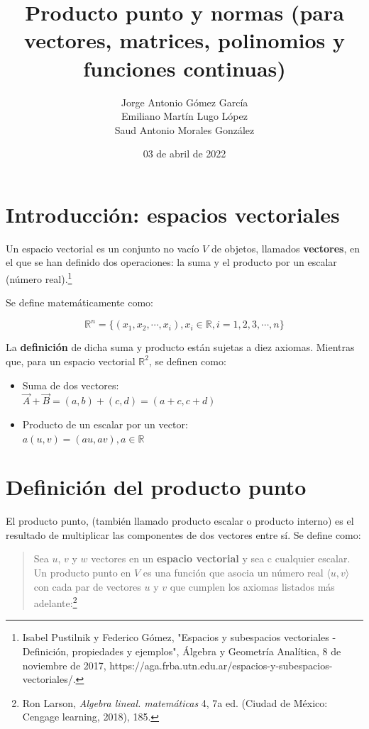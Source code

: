 \documentclass{article}
\title{Producto punto y normas (para vectores, matrices, polinomios y funciones continuas)}
\author{
    Jorge Antonio Gómez García \\
    Emiliano Martín Lugo López \\
    Saud Antonio Morales González}
\date{03 de abril de 2022}
\begin{document}
\maketitle

\section{Introducción: espacios vectoriales}

    Un espacio vectorial es un conjunto no vacío $V$ de objetos, llamados \textbf{vectores}, en el que se han definido dos operaciones: la suma y el producto por un escalar (número real).\footnote{Isabel Pustilnik y Federico Gómez, "Espacios y subespacios vectoriales - Definición, propiedades y ejemplos", Álgebra y Geometría Analítica, 8 de noviembre de 2017, https://aga.frba.utn.edu.ar/espacios-y-subespacios-vectoriales/.}

    Se define matemáticamente como:

    \begin{equation*}
        \mathbb{R}^n=\{ (x_1, x_2, \dotsb, x_i), x_i \in \mathbb{R}, i=1,2,3,\dotsb,n \}
    \end{equation*}

    La \textbf{definición} de dicha suma y producto están sujetas a diez axiomas. Mientras que, para un espacio vectorial $\mathbb{R}^2$, se definen como:
    \begin{itemize}
        \item Suma de dos vectores: \\
            $ {\vec{A} + \vec{B}= (a,b) + (c,d) = (a+c, c+d)} $
                
        \item Producto de un escalar por un vector: \\
            $ {a(u, v) = (au, av), a \in \mathbb{R}} $
                
    \end{itemize}

\section{Definición del producto punto}

    El producto punto, (también llamado producto escalar o producto interno) es el resultado de multiplicar las componentes de dos vectores entre sí. Se define como:

    \begin{quote}
        Sea $u$, $v$ y $w$ vectores en un \textbf{espacio vectorial} y sea c cualquier escalar. Un producto punto en $V$ es una función que asocia un número real $\langle u, v\rangle$ con cada par de vectores $u$ y $v$ que cumplen los axiomas listados más adelante:\footnote{Ron Larson, \textit{Algebra lineal. matemáticas} 4, 7a ed. (Ciudad de México: Cengage learning, 2018), 185.}
    \end{quote}
\end{document}
